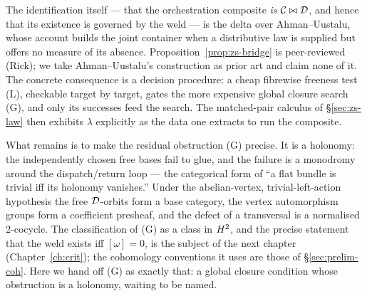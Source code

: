The identification itself --- that the orchestration composite \emph{is}
$\mathcal{C}\bowtie\mathcal{D}$, and hence that its existence is governed by the weld --- is the delta
over Ahman--Uustalu, whose account builds the joint container when a distributive
law is supplied but offers no measure of its absence. Proposition~\ref{prop:zs-bridge}
is peer-reviewed (Rick); we take Ahman--Uustalu's construction \cite{AhmanUustaluDL}
as prior art and claim none of it. The concrete consequence is a decision procedure:
a cheap fibrewise freeness test (L), checkable target by target, gates the more
expensive global closure search (G), and only its successes feed the search. The
matched-pair calculus of \S\ref{sec:zs-law} then exhibits $\lambda$ explicitly as
the data one extracts to run the composite.

What remains is to make the residual obstruction (G) precise. It is a holonomy: the
independently chosen free bases fail to glue, and the failure is a monodromy around
the dispatch/return loop --- the categorical form of ``a flat bundle is trivial iff
its holonomy vanishes.'' Under the abelian-vertex, trivial-left-action hypothesis
the free $\mathcal{D}$-orbits form a base category, the vertex automorphism groups form a
coefficient presheaf, and the defect of a transversal is a normalised $2$-cocycle.
The classification of (G) as a class in $H^2$, and the precise statement that the
weld exists iff $[\omega]=0$, is the subject of the next chapter
(Chapter~\ref{ch:crit}); the cohomology conventions it uses are those of
\S\ref{sec:prelim-coh}. Here we hand off (G) as exactly that: a global closure
condition whose obstruction is a holonomy, waiting to be named.


